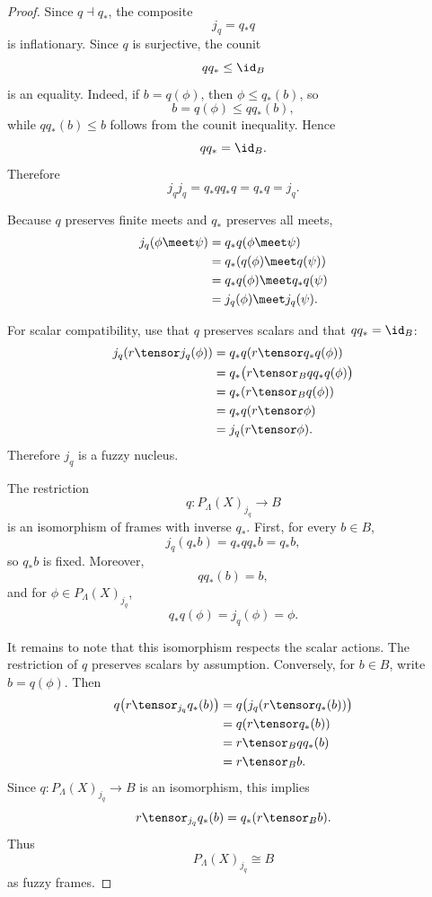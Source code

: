 \begin{proof}
Since \(q\dashv q_\ast\), the composite
\[
    j_q=q_\ast q
\]
is inflationary. Since \(q\) is surjective, the counit
\[
    qq_\ast\leq \id_B
\]
is an equality. Indeed, if \(b=q(\phi)\), then \(\phi\leq q_\ast(b)\), so
\[
    b=q(\phi)\leq qq_\ast(b),
\]
while \(qq_\ast(b)\leq b\) follows from the counit inequality. Hence
\[
    qq_\ast=\id_B.
\]
Therefore
\[
    j_qj_q
    =
    q_\ast q q_\ast q
    =
    q_\ast q
    =
    j_q.
\]

Because \(q\) preserves finite meets and \(q_\ast\) preserves all meets,
\[
\begin{aligned}
j_q(\phi\meet\psi)
&=
q_\ast q(\phi\meet\psi)
\\
&=
q_\ast(q(\phi)\meet q(\psi))
\\
&=
q_\ast q(\phi)\meet q_\ast q(\psi)
\\
&=
j_q(\phi)\meet j_q(\psi).
\end{aligned}
\]

For scalar compatibility, use that \(q\) preserves scalars and that
\(qq_\ast=\id_B\):
\[
\begin{aligned}
j_q(r\tensor j_q(\phi))
&=
q_\ast q(r\tensor q_\ast q(\phi))
\\
&=
q_\ast\bigl(r\tensor_B q q_\ast q(\phi)\bigr)
\\
&=
q_\ast(r\tensor_B q(\phi))
\\
&=
q_\ast q(r\tensor\phi)
\\
&=
j_q(r\tensor\phi).
\end{aligned}
\]
Therefore \(j_q\) is a fuzzy nucleus.

The restriction
\[
    q:P_\Lambda(X)_{j_q}\to B
\]
is an isomorphism of frames with inverse \(q_\ast\). First, for every \(b\in B\),
\[
    j_q(q_\ast b)
    =
    q_\ast q q_\ast b
    =
    q_\ast b,
\]
so \(q_\ast b\) is fixed. Moreover,
\[
    q q_\ast(b)=b,
\]
and for \(\phi\in P_\Lambda(X)_{j_q}\),
\[
    q_\ast q(\phi)=j_q(\phi)=\phi.
\]

It remains to note that this isomorphism respects the scalar actions. The restriction
of \(q\) preserves scalars by assumption. Conversely, for \(b\in B\), write
\(b=q(\phi)\). Then
\[
\begin{aligned}
q\bigl(r\tensor_{j_q}q_\ast(b)\bigr)
&=
q\bigl(j_q(r\tensor q_\ast(b))\bigr)
\\
&=
q(r\tensor q_\ast(b))
\\
&=
r\tensor_B qq_\ast(b)
\\
&=
r\tensor_B b.
\end{aligned}
\]
Since \(q:P_\Lambda(X)_{j_q}\to B\) is an isomorphism, this implies
\[
    r\tensor_{j_q}q_\ast(b)
    =
    q_\ast(r\tensor_B b).
\]
Thus
\[
    P_\Lambda(X)_{j_q}\cong B
\]
as fuzzy frames.
\end{proof}

